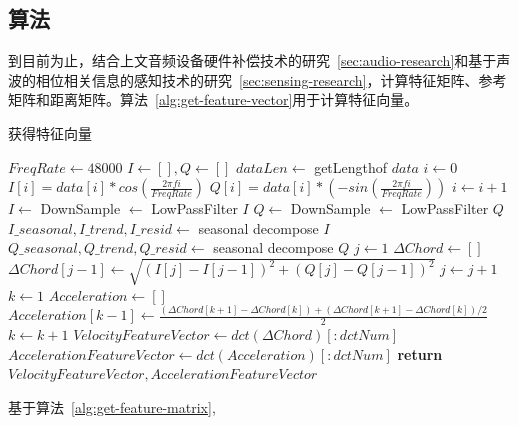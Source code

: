 \subsection{算法}
到目前为止，结合上文音频设备硬件补偿技术的研究~\ref{sec:audio-research}和基于声波的相位相关信息的感知技术的研究~\ref{sec:sensing-research}，计算特征矩阵、参考矩阵和距离矩阵。算法~\ref{alg:get-feature-vector}用于计算特征向量。
\begin{algorithm}
\caption{获得特征向量}
\label{alg:get-feature-vector}
\begin{algorithmic}[1]
\State $FreqRate \gets 48000$           
\State $I \gets [], Q \gets []$  
\State $dataLen \gets$ getLengthof $data$  
\State $i \gets 0$
 
\State $I[i]=data[i]*cos(\frac{2\pi fi}{FreqRate})$
\State $Q[i]=data[i]*(-sin(\frac{2\pi fi}{FreqRate}))$
\State $i \gets i + 1$
\EndWhile\label{euclidendwhile}
\State $I \gets $ DownSample $\gets $ LowPassFilter $I$   
\State $Q \gets $ DownSample $\gets $ LowPassFilter $Q$   
\State $I\_seasonal,I\_trend,I\_resid \gets$ seasonal decompose $I$      
\State $Q\_seasonal,Q\_trend,Q\_resid \gets$ seasonal decompose $Q$  
\State $j \gets 1$
\State $\Delta Chord \gets []$
 
\State $\Delta Chord[j-1] \gets \sqrt{(I[j]-I[j-1])^{2} + (Q[j]-Q[j-1])^{2}}$
\State $j \gets j + 1$
\EndWhile\label{euclidendwhile}
\State $k \gets 1$
\State $Acceleration \gets []$
 
\State $Acceleration[k-1] \gets \frac{(\Delta Chord[k+1] - \Delta Chord[k]) + (\Delta Chord[k+1] - \Delta Chord[k])/2}{2}$
\State $k \gets k + 1$
\EndWhile\label{euclidendwhile}
\State $VelocityFeatureVector \gets dct(\Delta Chord)[:dctNum]$
\State $AccelerationFeatureVector \gets dct(Acceleration)[:dctNum]$
\State \textbf{return} $VelocityFeatureVector,AccelerationFeatureVector$
\EndProcedure
\end{algorithmic}
\end{algorithm}
基于算法~\ref{alg:get-feature-matrix},
